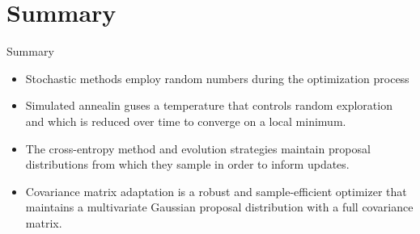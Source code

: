\documentclass{beamer}
\begin{document}
\section{Summary}
\begin{frame}{Summary}
    \begin{itemize}
        \item Stochastic methods employ random numbers during the optimization process
        \item Simulated annealin guses a temperature that controls random exploration and which is reduced over time to converge on a local minimum.
        \item The cross-entropy method and evolution strategies maintain proposal distributions from which they sample in order to inform updates.
        \item Covariance matrix adaptation is a robust and sample-efficient optimizer that maintains a multivariate Gaussian proposal distribution with a full covariance matrix.
    \end{itemize}
\end{frame}
\end{document}
